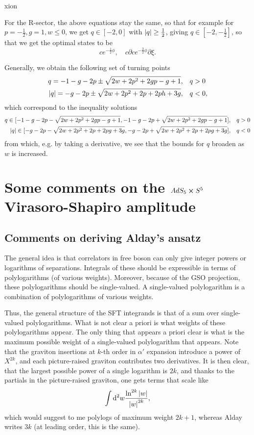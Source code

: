 xion\documentclass[12pt]{article}
\def\be{\begin{equation}}
\def\ee{\end{equation}}
\numberwithin{equation}{section}
\begin{document}
For the R-sector, the above equations stay the same, so that for example for $p = - \frac{1}{2}, g = 1, w \leq 0$, we get $q \in [-2,0]$ with $\abs{q} \geq \frac{1}{2}$, giving $q \in [-2, -\frac{1}{2}]$, so that we get the optimal states to be
\be
c e^{-\frac{1}{2}\phi}, \quad c \partial c e^{-\frac{3}{2}\phi} \partial \xi.
\ee

Generally, we obtain the following set of turning points
\be
\begin{aligned}
	q = -1 -g - 2p \pm \sqrt{2 w + 2p^2 + 2 g p - g + 1}, \quad &q > 0 \\
	\abs{q} = - g - 2p \pm \sqrt{2 w + 2 p^2 + 2 p + 2 p h + 3 g}, \quad &q < 0,
\end{aligned}
\ee
which correspond to the inequality solutions
\be
\begin{aligned}
	q \in [-1 -g - 2p - \sqrt{2 w + 2p^2 + 2 g p - g + 1}, -1 -g - 2p + \sqrt{2 w + 2p^2 + 2 g p - g + 1}], &\quad q > 0 \\
	\abs{q} \in [- g - 2p - \sqrt{2 w + 2 p^2 + 2 p + 2 p g + 3 g}, - g - 2p + \sqrt{2 w + 2 p^2 + 2 p + 2 p g + 3 g}], &\quad q < 0 \\
\end{aligned}
\ee
from which, e.g. by taking a derivative, we see that the bounds for $q$ broaden as $w$ is increased.


\section{Some comments on the $AdS_5 \cross S^5$ Virasoro-Shapiro amplitude}

\subsection{Comments on deriving Alday's ansatz}
The general idea is that correlators in free boson can only give integer powers or logarithms of separations. Integrals of these should be expressible in terms of polylogarithms (of various weights). Moreover, because of the GSO projection, these polylogarithms should be single-valued. A single-valued polylogarithm is a combination of polylogarithms of various weights.

Thus, the general structure of the SFT integrands is that of a sum over single-valued polylogarithms. What is not clear a priori is what weights of these polylogarithms appear. The only thing that appears a priori clear is what is the maximum possible weight of a single-valued polylogarithm that appears. Note that the graviton insertions at $k$-th order in $\alpha'$ expansion introduce a power of $X^{2k}$, and each picture-raised graviton contributes two derivatives. It is then clear, that the largest possible power of a single logarithm is $2k$, and thanks to the partials in the picture-raised graviton, one gets terms that scale like
\be
\int \dd^2 w \frac{\ln^{2k}\abs{w}}{\abs{w}^{2k}},
\ee
which would suggest to me polylogs of maximum weight $2k + 1$, whereas Alday writes $3k$ (at leading order, this is the same).
\end{document}
